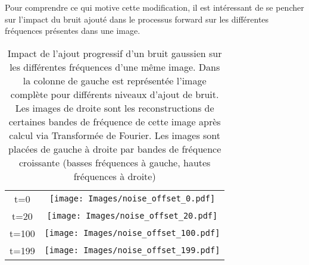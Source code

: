 \documentclass{article}
\begin{document}
Pour comprendre ce qui motive cette modification, il est intéressant de se pencher sur l'impact du bruit ajouté dans le processus forward sur les différentes fréquences présentes dans une image.
\begin{adjustwidth}{-1.5cm}{-2cm}
\begin{minipage}{1.0\textwidth}
    \begin{table}[H]
        \centering
        \begin{tabularx}{400pt}{cc}
        t=0 &
        \begin{minipage}{0.9\textwidth}
        \texttt{[image: Images/noise\_offset\_0.pdf]}
        \end{minipage}\\
        t=20 &
        \begin{minipage}{0.9\textwidth}
        \texttt{[image: Images/noise\_offset\_20.pdf]}
        \end{minipage}\\
        t=100 &
        \begin{minipage}{0.9\textwidth}
        \texttt{[image: Images/noise\_offset\_100.pdf]}
        \end{minipage}\\
        t=199 &
        \begin{minipage}{0.9\textwidth}
        \texttt{[image: Images/noise\_offset\_199.pdf]}
        \end{minipage}\\
        \end{tabularx}
    \caption{Impact de l'ajout progressif d'un bruit gaussien sur les différentes fréquences d'une même image. Dans la colonne de gauche est représentée l'image complète pour différents niveaux d'ajout de bruit. Les images de droite sont les reconstructions de certaines bandes de fréquence de cette image après calcul via Transformée de Fourier. Les images sont placées de gauche à droite par bandes de fréquence croissante (basses fréquences à gauche, hautes fréquences à droite)}
    \label{noise_offset}
    \end{table}
\end{minipage}
\end{adjustwidth}
\end{document}
